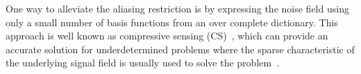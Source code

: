 \documentclass{article}
\begin{document}




One way to alleviate the aliasing restriction is by expressing the noise field using only a small  number of basis functions from an over complete dictionary.
This approach is well known as compressive sensing (CS)~\cite{candes2008introduction}, which can provide an accurate solution for underdetermined problems where the sparse characteristic of the underlying signal field is usually used to solve the problem~\cite{malioutov2005sparse}.
\end{document}
